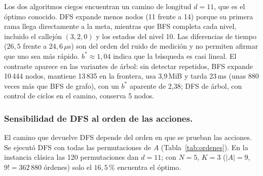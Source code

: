 \documentclass[runningheads]{llncs}
\newcommand{\st}[3]{(#1,#2,#3)}
\begin{document}
\begin{table}[t]
\centering
\caption{Métricas completas para $N=3$, $K=2$. Exp.: nodos expandidos; Gen.:
nodos generados; $|F|_{\max}$: tamaño máximo de la frontera; Mem.: máximo de
nodos simultáneos y pico de memoria (\texttt{tracemalloc}); $d$: longitud del
camino. Debajo de la línea, variantes sin detección de estados repetidos.}
\label{tab:e1}
\setlength{\tabcolsep}{4pt}
\end{table}

Los dos algoritmos ciegos encuentran un camino de longitud $d=11$, que es el
óptimo conocido. DFS expande menos nodos (11 frente a 14) porque su primera rama
llega directamente a la meta, mientras que BFS completa cada nivel, incluido el
callejón $\st{3}{2}{0}$ y los estados del nivel 10. Las diferencias de tiempo
($26{,}5$ frente a $24{,}6\,\mu$s) son del orden del ruido de medición y no
permiten afirmar que uno sea más rápido. $b^*\approx 1{,}04$ indica que la
búsqueda es casi lineal. El contraste aparece en las variantes de árbol: sin
detectar repetidos, BFS expande 10\,444 nodos, mantiene 13\,835 en la frontera,
usa 3{,}9\,MiB y tarda 23\,ms (unas 880 veces más que BFS de grafo), con un
$b^*$ aparente de 2{,}38; DFS de árbol, con control de ciclos en el camino,
conserva 5 nodos.

\subsubsection{Sensibilidad de DFS al orden de las acciones.}
El camino que devuelve DFS depende del orden en que se prueban las acciones.
Se ejecutó DFS con todas las permutaciones de $A$
(Tabla~\ref{tab:ordenes}). En la instancia clásica las 120 permutaciones dan
$d=11$; con $N=5$, $K=3$ ($|A|=9$, $9!=362\,880$ órdenes) solo el $16{,}5$\,\%
encuentra el óptimo.
\end{document}
